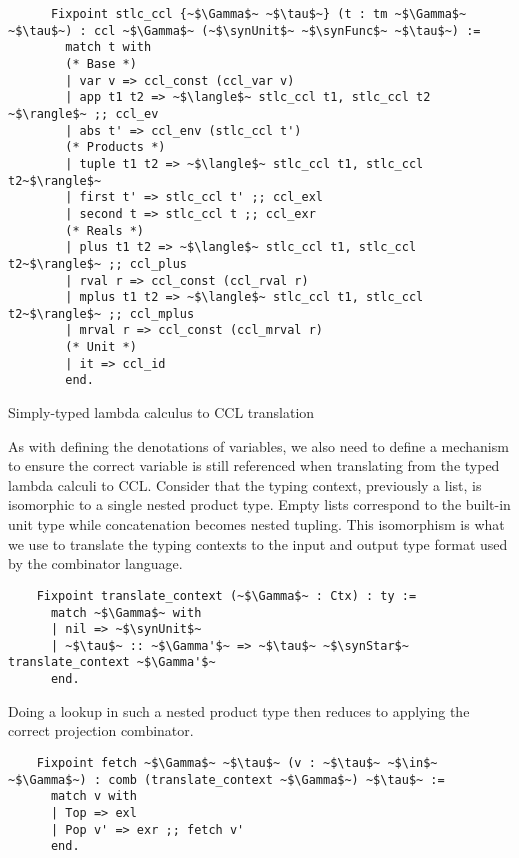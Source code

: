   \begin{listing}
    \begin{verbatim}
      Fixpoint stlc_ccl {~$\Gamma$~ ~$\tau$~} (t : tm ~$\Gamma$~ ~$\tau$~) : ccl ~$\Gamma$~ (~$\synUnit$~ ~$\synFunc$~ ~$\tau$~) :=
        match t with
        (* Base *)
        | var v => ccl_const (ccl_var v)
        | app t1 t2 => ~$\langle$~ stlc_ccl t1, stlc_ccl t2 ~$\rangle$~ ;; ccl_ev
        | abs t' => ccl_env (stlc_ccl t')
        (* Products *)
        | tuple t1 t2 => ~$\langle$~ stlc_ccl t1, stlc_ccl t2~$\rangle$~
        | first t' => stlc_ccl t' ;; ccl_exl
        | second t => stlc_ccl t ;; ccl_exr
        (* Reals *)
        | plus t1 t2 => ~$\langle$~ stlc_ccl t1, stlc_ccl t2~$\rangle$~ ;; ccl_plus
        | rval r => ccl_const (ccl_rval r)
        | mplus t1 t2 => ~$\langle$~ stlc_ccl t1, stlc_ccl t2~$\rangle$~ ;; ccl_mplus
        | mrval r => ccl_const (ccl_mrval r)
        (* Unit *)
        | it => ccl_id
        end.
    \end{verbatim}
    \caption{Simply-typed lambda calculus to CCL translation}
    \label{lst:combinator_stlc_to_ccl}
  \end{listing}

  As with defining the denotations of variables, we also need to define a mechanism to ensure the correct variable is still referenced when translating from the typed lambda calculi to CCL.
  Consider that the typing context, previously a list, is isomorphic to a single nested product type.
  Empty lists correspond to the built-in unit type while concatenation becomes nested tupling.
  This isomorphism is what we use to translate the typing contexts to the input and output type format used by the combinator language.

  \begin{verbatim}
    Fixpoint translate_context (~$\Gamma$~ : Ctx) : ty :=
      match ~$\Gamma$~ with
      | nil => ~$\synUnit$~
      | ~$\tau$~ :: ~$\Gamma'$~ => ~$\tau$~ ~$\synStar$~ translate_context ~$\Gamma'$~
      end.
  \end{verbatim}

  Doing a lookup in such a nested product type then reduces to applying the correct projection combinator.

  \begin{verbatim}
    Fixpoint fetch ~$\Gamma$~ ~$\tau$~ (v : ~$\tau$~ ~$\in$~ ~$\Gamma$~) : comb (translate_context ~$\Gamma$~) ~$\tau$~ :=
      match v with
      | Top => exl
      | Pop v' => exr ;; fetch v'
      end.
  \end{verbatim}

